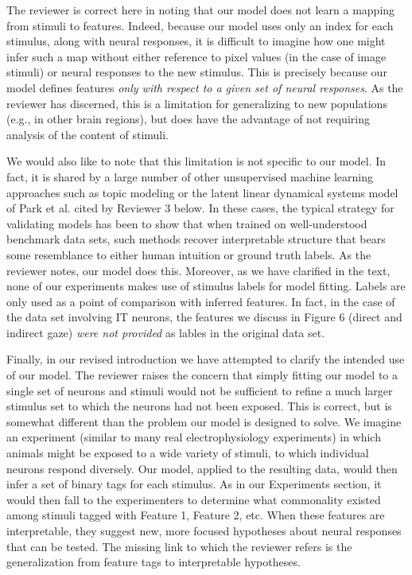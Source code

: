 \documentclass[12pt,a4paper]{article}
\newcommand{\edit}[1]{\textcolor{edit}{#1}}
\begin{document}
{\color{red}{I want to be really careful here. This is just a first stab.}}

\edit{
The reviewer is correct here in noting that our model does not learn a mapping from stimuli to features. Indeed, because our model uses only an index for each stimulus, along with neural responses, it is difficult to imagine how one might infer such a map without either reference to pixel values (in the case of image stimuli) or neural responses to the new stimulus. This is precisely because our model defines features \emph{only with respect to a given set of neural responses}. As the reviewer has discerned, this is a limitation for generalizing to new populations (e.g., in other brain regions), but does have the advantage of not requiring analysis of the content of stimuli.
}

\edit{
We would also like to note that this limitation is not specific to our model. In fact, it is shared by a large number of other unsupervised machine learning approaches such as topic modeling or the latent linear dynamical systems model of Park et al. cited by Reviewer 3 below. In these cases, the typical strategy for validating models has been to show that when trained on well-understood benchmark data sets, such methods recover interpretable structure that bears some resemblance to either human intuition or ground truth labels. As the reviewer notes, our model does this. Moreover, as we have clarified in the text, none of our experiments makes use of stimulus labels for model fitting. Labels are only used as a point of comparison with inferred features. In fact, in the case of the data set involving IT neurons, the features we discuss in Figure 6 (direct and indirect gaze) \emph{were not provided} as lables in the original data set.
}

\edit{
Finally, in our revised introduction we have attempted to clarify the intended use of our model. The reviewer raises the concern that simply fitting our model to a single set of neurons and stimuli would not be sufficient to refine a much larger stimulus set to which the neurons had not been exposed. This is correct, but is somewhat different than the problem our model is designed to solve. We imagine an experiment (similar to many real electrophysiology experiments) in which animals might be exposed to a wide variety of stimuli, to which individual neurons respond diversely. Our model, applied to the resulting data, would then infer a set of binary tags for each stimulus. As in our Experiments section, it would then fall to the experimenters to determine what commonality existed among stimuli tagged with Feature 1, Feature 2, etc. When these features are interpretable, they suggest new, more focused hypotheses about neural responses that can be tested. The missing link to which the reviewer refers is the generalization from feature tags to interpretable hypotheses.
}
\end{document}
